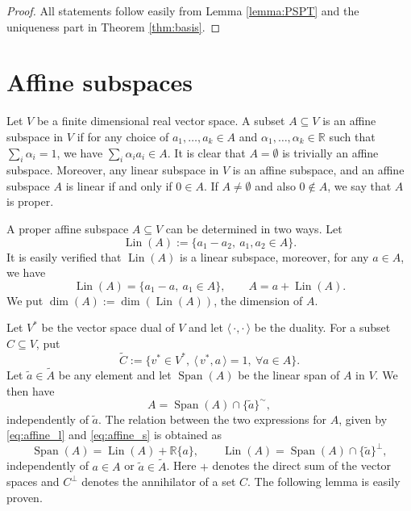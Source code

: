 \documentclass[12pt]{article}
\theoremstyle{definition}
\theoremstyle{remark}
\def\lin{\operatorname{Lin}}
\def\Span{\operatorname{Span}}
\def\<{\langle\,}
\def\>{\,\rangle}
\begin{document}
\begin{proof} All statements follow easily from Lemma \ref{lemma:PSPT} and the uniqueness part in Theorem
\ref{thm:basis}. 


\end{proof}

\section{Affine subspaces}
\label{sec:app_affine}
Let $V$ be a finite dimensional real vector space. A subset $A\subseteq V$ is an affine
subspace in $V$ if for any choice of  $a_1,\dots, a_k\in A$ and  $\alpha_1,\dots,\alpha_k\in \mathbb R$
such that $\sum_i\alpha_i=1$, we have $\sum_i\alpha_i a_i\in A$. It is clear that
$A=\emptyset$ is trivially an affine subspace.  Moreover, any linear subspace in $V$ is an affine subspace,
and an
affine subspace $A$ is linear if and only if $0\in A$. If $A \neq\emptyset$ and also
$0\notin A$, we say that $A$ is proper. 

A proper  affine subspace $A\subseteq V$ can be determined in two ways. Let 
\[
\lin(A):=\{a_1-a_2,\ a_1,a_2\in A\}.
\]
It is easily verified that $\lin(A)$ is a linear subspace, moreover, for any $a\in A$, we
have
\begin{equation}\label{eq:affine_l}
\lin(A)=\{a_1-a,\ a_1\in A\},\qquad A=a+\lin(A).
\end{equation}
We put $\dim(A):=\dim(\lin(A))$, the dimension of $A$. 

Let $V^*$ be the vector space dual of $V$ and let $\<\cdot,\cdot\>$ be the
duality. For a subset $C\subseteq V$, put
\[
\tilde C:=\{v^*\in V^*,\ \<v^*,a\>=1,\ \forall a\in A\}.
\]
Let $\tilde a\in \tilde A$ be any element and let $\Span(A)$ be the linear span of $A$ in
$V$. We then have
\begin{equation}\label{eq:affine_s}
A=\Span(A)\cap \{\tilde a\}^\sim,
\end{equation}
independently of $\tilde a$. The relation between the two expressions for $A$, given by
\eqref{eq:affine_l} and \eqref{eq:affine_s} is obtained as
\begin{equation}\label{eq:LandS}
\Span(A)=\lin(A)+\mathbb R\{a\},\qquad \lin(A)=\Span(A)\cap \{\tilde a\}^\perp,
\end{equation}
independently of $a\in A$ or $\tilde a\in \tilde A$. Here $+$ denotes the direct sum of
the vector spaces and $C^\perp$ denotes the annihilator of a set $C$.
The following lemma is  easily proven.
\end{document}
